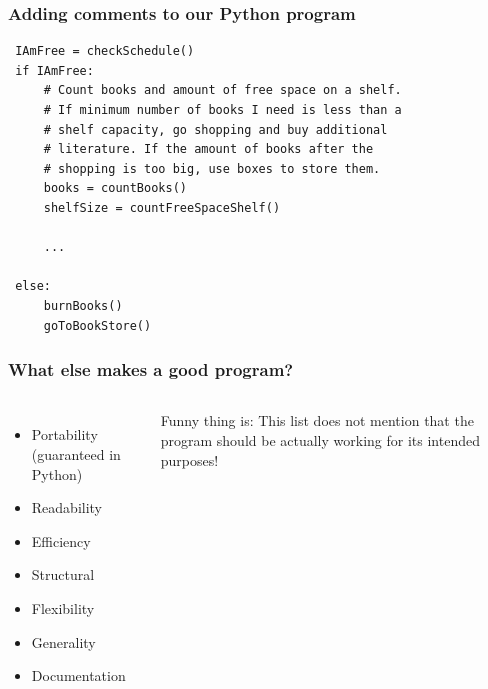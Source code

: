  \begin{frame}[fragile]
  \frametitle{Adding comments to our Python program}
  \centering{}
  \begin{lstlisting}
 IAmFree = checkSchedule()
 if IAmFree:
     # Count books and amount of free space on a shelf. 
     # If minimum number of books I need is less than a 
     # shelf capacity, go shopping and buy additional 
     # literature. If the amount of books after the 
     # shopping is too big, use boxes to store them.
     books = countBooks()
     shelfSize = countFreeSpaceShelf()
     
     ...
     
 else:
     burnBooks()
     goToBookStore()
 \end{lstlisting}
 \end{frame}
 


\begin{frame}
  \frametitle{What else makes a good program?}
  \begin{columns}[T]
        \begin{itemize}
            \item Portability (guaranteed in Python)
            \item Readability
            \item Efficiency 
            \item Structural
            \item Flexibility
            \item Generality
            \item Documentation
        \end{itemize}
Funny thing is: This list does not mention that the program should be actually working for its intended purposes!
    \end{columns}
\end{frame}


